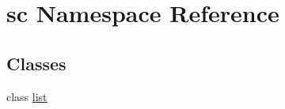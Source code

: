\hypertarget{namespacesc}{}\section{sc Namespace Reference}
\label{namespacesc}
\subsection*{Classes}
\begin{DoxyCompactItemize}
\item 
class \mbox{\hyperlink{classsc_1_1list}{list}}
\end{DoxyCompactItemize}
